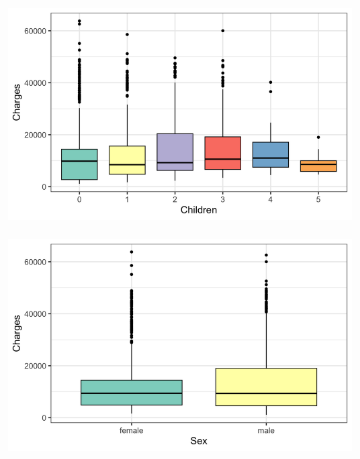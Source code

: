\documentclass{article}
\begin{document}
\begin{figure}[!ht]
	\centering
	
	\begin{subfigure}{0.45\textwidth}
		\centering
		\includegraphics[width=\linewidth]{images/children_charges.png}
		\label{fig:children_charges}
	\end{subfigure}
	\hspace{0.05\textwidth} %
	\begin{subfigure}{0.45\textwidth}
		\centering
		\includegraphics[width=\linewidth]{images/sex_charges.png}
		\label{fig:sex_charges}
	\end{subfigure}
	
	\vspace{0.5cm} %
	

\end{figure}
\end{document}
